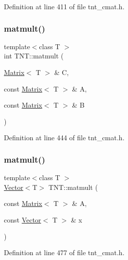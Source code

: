 Definition at line 411 of file tnt\+\_\+cmat.\+h.

\mbox{\label{namespaceTNT_abce6514445cfca8c59b1bec5758c7b08}} 
\subsubsection{\texorpdfstring{matmult()}{matmult()}\hspace{0.1cm}{\footnotesize\ttfamily [3/4]}}
{\footnotesize\ttfamily template$<$class T $>$ \\
int T\+N\+T\+::matmult (\begin{DoxyParamCaption}\item[{\hyperlink{classTNT_1_1Matrix}{Matrix}$<$ T $>$ \&}]{C,  }\item[{const \hyperlink{classTNT_1_1Matrix}{Matrix}$<$ T $>$ \&}]{A,  }\item[{const \hyperlink{classTNT_1_1Matrix}{Matrix}$<$ T $>$ \&}]{B }\end{DoxyParamCaption})\hspace{0.3cm}{\ttfamily [inline]}}



Definition at line 444 of file tnt\+\_\+cmat.\+h.

\mbox{\label{namespaceTNT_af5e7c7412c13afcfa68c1b0c71ae1ab6}} 
\subsubsection{\texorpdfstring{matmult()}{matmult()}\hspace{0.1cm}{\footnotesize\ttfamily [4/4]}}
{\footnotesize\ttfamily template$<$class T $>$ \\
\hyperlink{classTNT_1_1Vector}{Vector}$<$T$>$ T\+N\+T\+::matmult (\begin{DoxyParamCaption}\item[{const \hyperlink{classTNT_1_1Matrix}{Matrix}$<$ T $>$ \&}]{A,  }\item[{const \hyperlink{classTNT_1_1Vector}{Vector}$<$ T $>$ \&}]{x }\end{DoxyParamCaption})}



Definition at line 477 of file tnt\+\_\+cmat.\+h.

\mbox{\label{namespaceTNT_a008b866b3938af612e303fa477b844bc}} 
